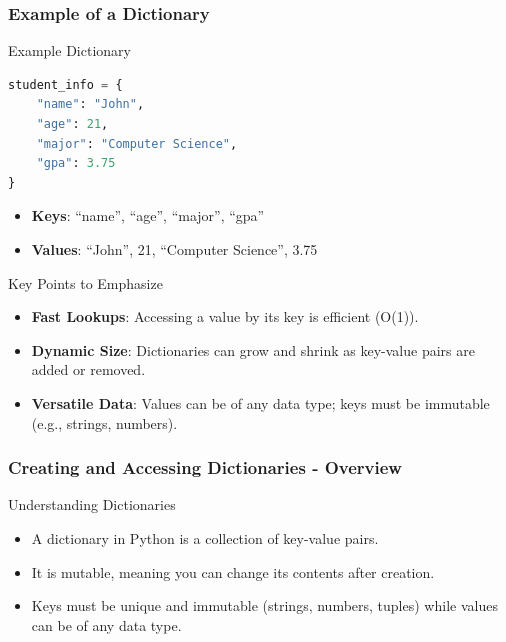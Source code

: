 \documentclass{beamer}
\begin{document}
\begin{frame}[fragile]
    \frametitle{Example of a Dictionary}
    \begin{block}{Example Dictionary}
        \begin{lstlisting}[language=Python]
student_info = {
    "name": "John",
    "age": 21,
    "major": "Computer Science",
    "gpa": 3.75
}
        \end{lstlisting}
    \end{block}
    
    \begin{itemize}
        \item \textbf{Keys}: ``name'', ``age'', ``major'', ``gpa''
        \item \textbf{Values}: ``John'', 21, ``Computer Science'', 3.75
    \end{itemize}
    
    \begin{block}{Key Points to Emphasize}
        \begin{itemize}
            \item \textbf{Fast Lookups}: Accessing a value by its key is efficient (O(1)).
            \item \textbf{Dynamic Size}: Dictionaries can grow and shrink as key-value pairs are added or removed.
            \item \textbf{Versatile Data}: Values can be of any data type; keys must be immutable (e.g., strings, numbers).
        \end{itemize}
    \end{block}
\end{frame}

\begin{frame}[fragile]
    \frametitle{Creating and Accessing Dictionaries - Overview}
    \begin{block}{Understanding Dictionaries}
        \begin{itemize}
            \item A dictionary in Python is a collection of key-value pairs.
            \item It is mutable, meaning you can change its contents after creation.
            \item Keys must be unique and immutable (strings, numbers, tuples) while values can be of any data type.
        \end{itemize}
    \end{block}
\end{frame}
\end{document}
